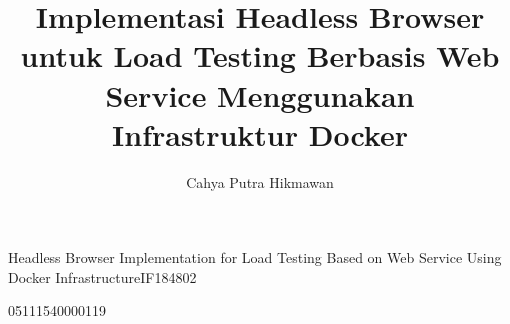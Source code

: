 \title{Implementasi Headless Browser untuk Load Testing Berbasis Web Service Menggunakan Infrastruktur Docker
}{Headless Browser Implementation for Load Testing Based on Web Service Using Docker Infrastructure}{IF184802}

\author{Cahya Putra Hikmawan}{05111540000119}



